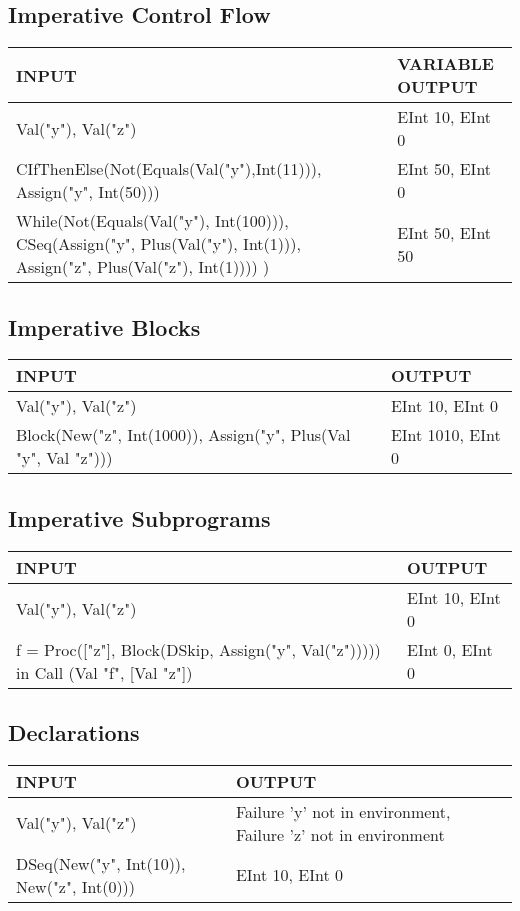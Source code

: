 \documentclass[11pt]{article}
\begin{document}
\subsection{Imperative Control Flow}
\label{sec:orge8f3f63}
\begin{center}
\begin{tabularx}{\textwidth}{Xl}
INPUT & VARIABLE OUTPUT\\
\hline
Val("y"), Val("z") & EInt 10, EInt 0\\
CIfThenElse(Not(Equals(Val("y"),Int(11))), Assign("y", Int(50))) & EInt 50, EInt 0\\
While(Not(Equals(Val("y"), Int(100))), CSeq(Assign("y", Plus(Val("y"), Int(1))), Assign("z", Plus(Val("z"), Int(1)))) ) & EInt 50, EInt 50\\
\end{tabularx}
\end{center}
\subsection{Imperative Blocks}
\label{sec:org5e081b2}
\begin{center}
\begin{tabularx}{\textwidth}{Xl}
INPUT & OUTPUT\\
\hline
Val("y"), Val("z") & EInt 10, EInt 0\\
Block(New("z", Int(1000)), Assign("y", Plus(Val "y", Val "z"))) & EInt 1010, EInt 0\\
\end{tabularx}
\end{center}
\subsection{Imperative Subprograms}
\label{sec:org3de468c}
\begin{center}
\begin{tabularx}{\textwidth}{Xl}
INPUT & OUTPUT\\
\hline
Val("y"), Val("z") & EInt 10, EInt 0\\
f = Proc(["z"], Block(DSkip, Assign("y", Val("z"))))) in Call (Val "f", [Val "z"]) & EInt 0, EInt 0\\
\end{tabularx}
\end{center}
\subsection{Declarations}
\label{sec:org990e170}
\begin{center}
\begin{tabularx}{\textwidth}{lX}
INPUT & OUTPUT\\
\hline
Val("y"), Val("z") & Failure 'y' not in environment, Failure 'z' not in environment\\
DSeq(New("y", Int(10)), New("z", Int(0))) & EInt 10, EInt 0\\
\end{tabularx}
\end{center}
\end{document}

